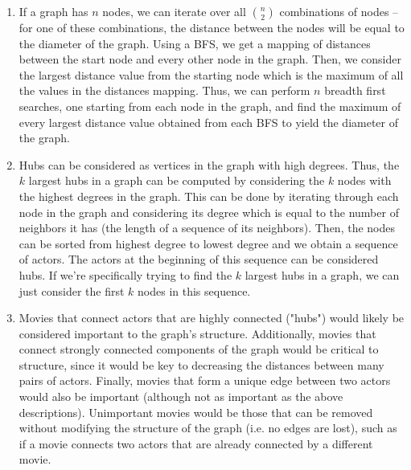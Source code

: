 \documentclass{article}
\begin{document}
\begin{enumerate}
    \item If a graph has $n$ nodes, we can iterate over all $\binom{n}{2}$ combinations of nodes -- for one of these combinations, the distance between the nodes will be equal to the diameter of the graph. Using a BFS, we get a mapping of distances between the start node and every other node in the graph. Then, we consider the largest distance value from the starting node which is the maximum of all the values in the distances mapping. Thus, we can perform $n$ breadth first searches, one starting from each node in the graph, and find the maximum of every largest distance value obtained from each BFS to yield the diameter of the graph.
    
    \item Hubs can be considered as vertices in the graph with high degrees. Thus, the $k$ largest hubs in a graph can be computed by considering the $k$ nodes with the highest degrees in the graph. This can be done by iterating through each node in the graph and considering its degree which is equal to the number of neighbors it has (the length of a sequence of its neighbors). Then, the nodes can be sorted from highest degree to lowest degree and we obtain a sequence of actors. The actors at the beginning of this sequence can be considered hubs. If we're specifically trying to find the $k$ largest hubs in a graph, we can just consider the first $k$ nodes in this sequence. 

    \item Movies that connect actors that are highly connected ("hubs") would likely be considered important to the graph's structure. Additionally, movies that connect strongly connected components of the graph would be critical to structure, since it would be key to decreasing the distances between many pairs of actors. Finally, movies that form a unique edge between two actors would also be important (although not as important as the above descriptions). Unimportant movies would be those that can be removed without modifying the structure of the graph (i.e. no edges are lost), such as if a movie connects two actors that are already connected by a different movie.


\end{enumerate}
\end{document}
